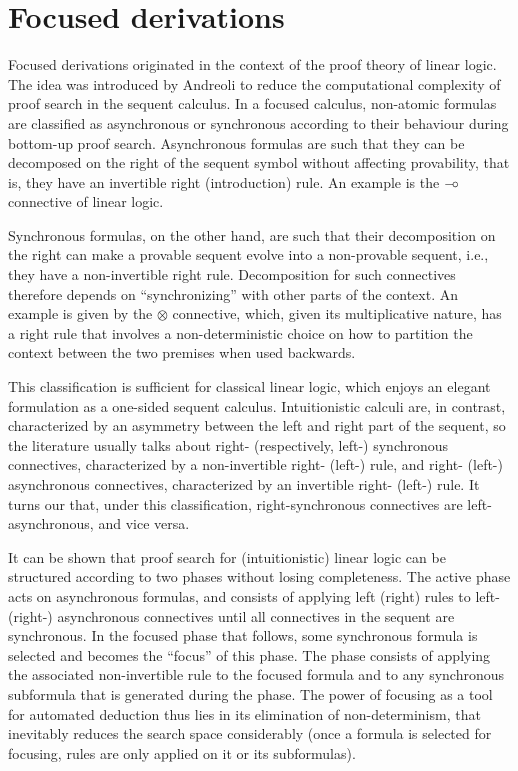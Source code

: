 \section{Focused derivations}\label{sec:focusing}

Focused derivations originated in the context of the proof theory of linear
logic. The idea was introduced by Andreoli \cite{andreoli92} to reduce the
computational complexity of proof search in the sequent calculus.
In a focused calculus, non-atomic formulas are classified as asynchronous or
synchronous according to their behaviour during bottom-up proof search.
Asynchronous formulas are such that they can be decomposed on the right of the
sequent symbol without affecting provability, that is, they have an invertible
right (introduction) rule. An example is the $\mathbin{{-}\mkern-3.5mu{\circ}}$ connective of linear logic.

Synchronous formulas, on the other hand, are such that their decomposition on
the right can make a provable sequent evolve into a non-provable sequent, i.e.,
they have a non-invertible right rule. Decomposition for such connectives
therefore depends on ``synchronizing'' with other parts of the context.  An
example is given by the $\otimes$ connective, which, given its multiplicative
nature, has a right rule that involves a non-deterministic choice on how to
partition the context between the two premises when used backwards.

This classification is sufficient for classical linear logic, which enjoys an
elegant formulation as a one-sided sequent calculus.  Intuitionistic calculi
are, in contrast, characterized by an asymmetry between the left and right part
of the sequent, so the literature usually talks about right- (respectively,
left-) synchronous connectives, characterized by a non-invertible right- (left-)
rule, and right- (left-) asynchronous connectives, characterized by an
invertible right- (left-) rule.  It turns our that, under this classification,
right-synchronous connectives are left-asynchronous, and vice versa.

It can be shown that proof search for (intuitionistic) linear logic can be
structured according to two phases without losing completeness. The active phase
acts on asynchronous formulas, and consists of applying left (right) rules to
left- (right-) asynchronous connectives until all connectives in the sequent are
synchronous. In the focused phase that follows, some synchronous formula is
selected and becomes the ``focus'' of this phase. The phase consists of applying
the associated non-invertible rule to the focused formula and to any synchronous
subformula that is generated during the phase.  The power of focusing as a tool
for automated deduction thus lies in its elimination of non-determinism, that
inevitably reduces the search space considerably (once a formula is selected for
focusing, rules are only applied on it or its subformulas).


